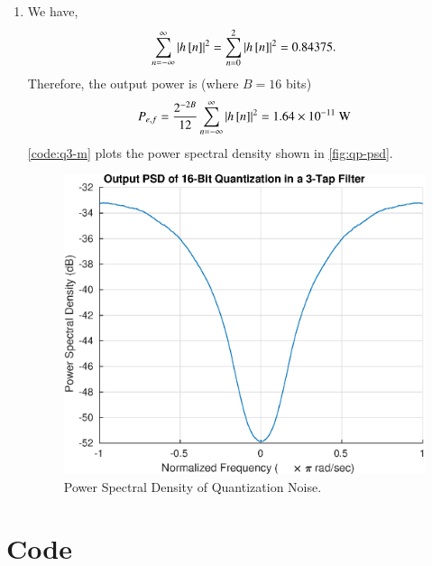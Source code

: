 \documentclass[journal,12pt,twocolumn]{IEEEtran}
\newenvironment{code}{\captionsetup{type=listing}}{}
\begin{document}
\begin{enumerate}
\begin{enumerate}
        \item We have,
        \begin{equation}
            \sum_{n=-\infty}^{\infty}\left\vert h{}\left[n\right]\right\vert^2 = \sum_{n=0}^2\left\vert h{}\left[n\right]\right\vert^2 = 0.84375. \\
        \end{equation}
            Therefore, the output power is (where \(B = 16\) bits)
        \begin{equation}
            P_{e,f} = \frac{2^{-2B}}{12}\sum_{n=-\infty}^{\infty}\left\vert h{}\left[n\right]\right\vert^2 = 1.64\times 10^{-11}\text{ W} 
        \end{equation}
        \autoref{code:q3-m} plots the power spectral density shown in
        \autoref{fig:qp-psd}.
        \begin{figure}[!ht]
            \centering
            \includegraphics[width=\columnwidth]{figs/q3_fig1.eps}
            \caption{Power Spectral Density of Quantization Noise.}
            \label{fig:qp-psd}
        \end{figure}
    \end{enumerate}
\end{enumerate}

\section{Code}

\begin{code}
    \inputminted[linenos,xleftmargin=1em,breaklines,frame=single]{matlab}{codes/q1.c}
    \label{code:q1-c}
\end{code}
\end{document}

